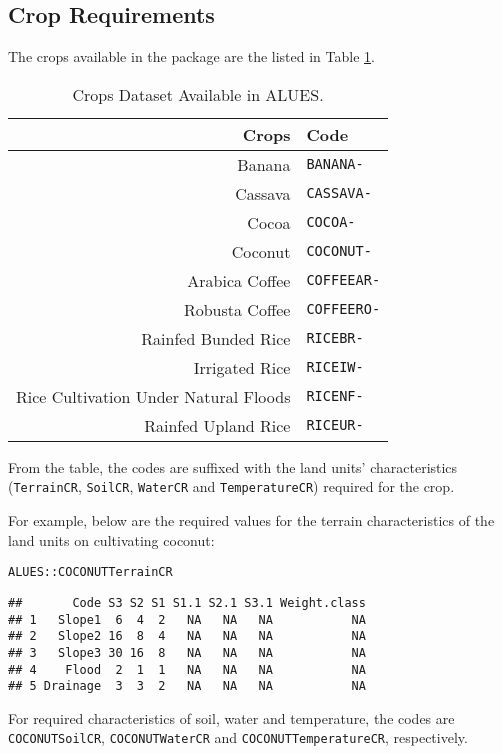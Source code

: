 \documentclass[11pt,fleqn]{article}\usepackage[]{graphicx}\usepackage[]{color}
\makeatletter
\newcommand{\hlstd}[1]{\textcolor[rgb]{0.345,0.345,0.345}{#1}}%
\newenvironment{kframe}{%
 \def\at@end@of@kframe{}%
 \ifinner\ifhmode%
  \def\at@end@of@kframe{\end{minipage}}%
  \begin{minipage}{\columnwidth}%
 \fi\fi%
 \def\FrameCommand##1{\hskip\@totalleftmargin \hskip-\fboxsep
 \colorbox{shadecolor}{##1}\hskip-\fboxsep
     \hskip-\linewidth \hskip-\@totalleftmargin \hskip\columnwidth}%
 \MakeFramed {\advance\hsize-\width
   \@totalleftmargin\z@ \linewidth\hsize
   \@setminipage}}%
 {\par\unskip\endMakeFramed%
 \at@end@of@kframe}
\newenvironment{knitrout}{}{} %
\makeatother
\begin{document}
\subsection{Crop Requirements}
The crops available in the package are the listed in Table \ref{tab:cropdat}.
\begin{table}[h]
\begin{tabular}{rl}
\toprule
Crops&Code\\
\midrule
Banana&\verb|BANANA-|\\
Cassava&\verb|CASSAVA-|\\
Cocoa&\verb|COCOA-|\\
Coconut&\verb|COCONUT-|\\
Arabica Coffee&\verb|COFFEEAR-|\\
Robusta Coffee&\verb|COFFEERO-|\\
Rainfed Bunded Rice&\verb|RICEBR-|\\
Irrigated Rice&\verb|RICEIW-|\\
Rice Cultivation Under Natural Floods&\verb|RICENF-|\\
Rainfed Upland Rice&\verb|RICEUR-|\\
\bottomrule
\end{tabular}
\caption{Crops Dataset Available in ALUES.}
\label{tab:cropdat}
\end{table}
From the table, the codes are suffixed with the land units' characteristics (\verb|TerrainCR|, \verb|SoilCR|, \verb|WaterCR| and \verb|TemperatureCR|) required for the crop.

\newpage For example, below are the required values for the terrain characteristics of the land units on cultivating coconut:
\begin{knitrout}
\color{fgcolor}\begin{kframe}
\begin{alltt}
\hlstd{ALUES::COCONUTTerrainCR}
\end{alltt}
\begin{verbatim}
##       Code S3 S2 S1 S1.1 S2.1 S3.1 Weight.class
## 1   Slope1  6  4  2   NA   NA   NA           NA
## 2   Slope2 16  8  4   NA   NA   NA           NA
## 3   Slope3 30 16  8   NA   NA   NA           NA
## 4    Flood  2  1  1   NA   NA   NA           NA
## 5 Drainage  3  3  2   NA   NA   NA           NA
\end{verbatim}
\end{kframe}
\end{knitrout}
For required characteristics of soil, water and temperature, the codes are \verb|COCONUTSoilCR|, \verb|COCONUTWaterCR| and \verb|COCONUTTemperatureCR|, respectively.
\end{document}

